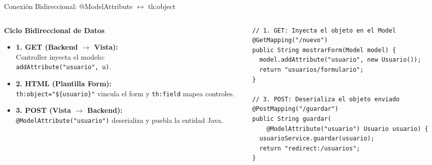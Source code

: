 \documentclass[aspectratio=169]{beamer}
\begin{document}

\begin{frame}[fragile]{Conexi\'on Bidireccional: @ModelAttribute $\longleftrightarrow$ th:object}
\begin{columns}[c]
\begin{column}{0.48\textwidth}
  \textbf{Ciclo Bidireccional de Datos}
  \begin{itemize}
    \item \textbf{1. GET (Backend $\rightarrow$ Vista):}\\
      Controller inyecta el modelo:\\ \texttt{addAttribute("usuario", u)}.
    \item \textbf{2. HTML (Plantilla Form):}\\
      \texttt{th:object="\$\{usuario\}"} vincula el form y \texttt{th:field} mapea controles.
    \item \textbf{3. POST (Vista $\rightarrow$ Backend):}\\
      \texttt{@ModelAttribute("usuario")} deserializa y puebla la entidad Java.
  \end{itemize}
\end{column}
\begin{column}{0.50\textwidth}
\begin{lstlisting}[style=SpringCodeStyle]
// 1. GET: Inyecta el objeto en el Model
@GetMapping("/nuevo")
public String mostrarForm(Model model) {
  model.addAttribute("usuario", new Usuario());
  return "usuarios/formulario";
}

// 3. POST: Deserializa el objeto enviado
@PostMapping("/guardar")
public String guardar(
    @ModelAttribute("usuario") Usuario usuario) {
  usuarioService.guardar(usuario);
  return "redirect:/usuarios";
}
\end{lstlisting}
\end{column}
\end{columns}
\end{frame}
\end{document}
